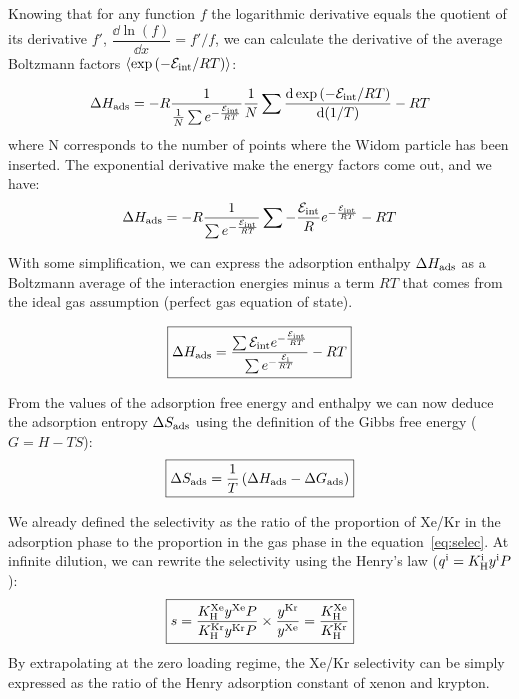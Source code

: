 \documentclass[main.tex]{subfiles}
\begin{document}
Knowing that for any function $f$ the logarithmic derivative equals the quotient of its derivative $f'$, $\dfrac{\dd \ln\left(f\right)}{\dd x}=f'/f$, we can calculate the derivative of the average Boltzmann factors $\langle \exp\left(-\mathcal{E}_{\text{int}}/RT\right) \rangle$:

\begin{equation}
  \Delta H_{\text{ads}} = -R\dfrac{1}{\frac{1}{N}\sum e^{-\frac{\mathcal{E}_{\text{int}}}{RT}}} \frac{1}{N}\sum \dfrac{\mathop{}\mathopen{}\mathrm{d} \exp\left(-\mathcal{E}_{\text{int}}/RT\right)}{\mathop{}\mathopen{}\mathrm{d} (1/T)} - RT
\end{equation}
where N corresponds to the number of points where the Widom particle has been inserted.
The exponential derivative make the energy factors come out, and we have:
\begin{equation}
  \Delta H_{\text{ads}} = -R\dfrac{1}{\sum e^{-\frac{\mathcal{E}_{\text{int}}}{RT}}} \sum - \frac{\mathcal{E}_{\text{int}}}{R} e^{-\frac{\mathcal{E}_{\text{int}}}{RT}} - RT
\end{equation}

With some simplification, we can express the adsorption enthalpy $\Delta H_{\text{ads}}$ as a Boltzmann average of the interaction energies minus a term $RT$ that comes from the ideal gas assumption (perfect gas equation of state).

\begin{equation}\label{eq:ads_enthalpy}
  \boxed{
  \Delta H_{\text{ads}} = \dfrac{\sum \mathcal{E}_{\text{int}}e^{-\frac{\mathcal{E}_{\text{int}}}{RT}}}{\sum e^{-\frac{\mathcal{E}_{\text{i}}}{RT}}} - RT
  }
\end{equation}

From the values of the adsorption free energy and enthalpy we can now deduce the adsorption entropy $\Delta S_{\text{ads}}$ using the definition of the Gibbs free energy ($G = H-TS$):
\begin{equation}\label{eq:ads_entropy}
  \boxed{
  \Delta S_{\text{ads}} = \dfrac{1}{T} \left(\Delta H_{\text{ads}} - \Delta G_{\text{ads}} \right)
  }
\end{equation}

We already defined the selectivity as the ratio of the proportion of Xe/Kr in the adsorption phase to the proportion in the gas phase in the equation~\ref{eq:selec}. At infinite dilution, we can rewrite the selectivity using the Henry's law ($q^{\text{i}}=K_{\text{H}}^{\text{i}}y^{\text{i}}P$):
\begin{equation}
  \boxed{
  s = \dfrac{K_{\text{H}}^{\text{Xe}}y^{\text{Xe}}P}{K_{\text{H}}^{\text{Kr}}y^{\text{Kr}}P}\times\dfrac{y^{\text{Kr}}}{y^{\text{Xe}}} = \dfrac{K_{\text{H}}^{\text{Xe}}}{K_{\text{H}}^{\text{Kr}}}
  }
\end{equation}
By extrapolating at the zero loading regime, the Xe/Kr selectivity can be simply expressed as the ratio of the Henry adsorption constant of xenon and krypton.
\end{document}
